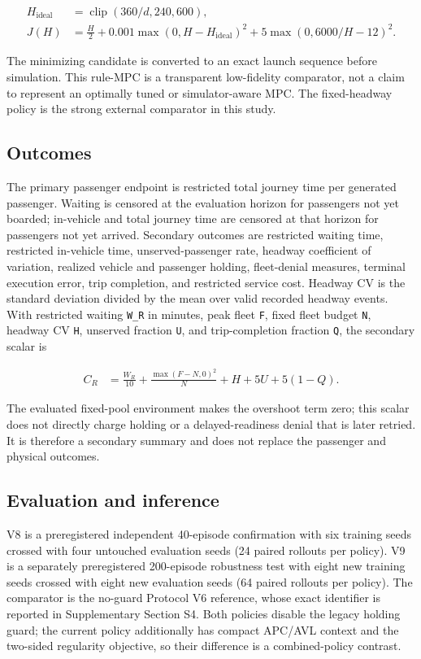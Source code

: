 \documentclass[preprint,12pt,authoryear,nopreprintline]{elsarticle}
\begin{document}
\[\begin{aligned}
H_{\mathrm{ideal}} &= \operatorname{clip}(360/d,240,600), \\
J(H) &= \frac{H}{2}
 + 0.001\max(0,H-H_{\mathrm{ideal}})^2
 + 5\max(0,6000/H-12)^2.
\end{aligned}\]

The minimizing candidate is converted to an exact launch sequence before
simulation. This rule-MPC is a transparent low-fidelity comparator, not
a claim to represent an optimally tuned or simulator-aware MPC. The
fixed-headway policy is the strong external comparator in this study.

\subsection{Outcomes}\label{outcomes}

The primary passenger endpoint is restricted total journey time per
generated passenger. Waiting is censored at the evaluation horizon for
passengers not yet boarded; in-vehicle and total journey time are
censored at that horizon for passengers not yet arrived. Secondary
outcomes are restricted waiting time, restricted in-vehicle time,
unserved-passenger rate, headway coefficient of variation, realized
vehicle and passenger holding, fleet-denial measures, terminal execution
error, trip completion, and restricted service cost. Headway CV is the
standard deviation divided by the mean over valid recorded headway
events. With restricted waiting \texttt{W\_R} in minutes, peak fleet
\texttt{F}, fixed fleet budget \texttt{N}, headway CV \texttt{H},
unserved fraction \texttt{U}, and trip-completion fraction \texttt{Q},
the secondary scalar is

\[\begin{aligned}
C_R &= \frac{W_R}{10}
 + \frac{\max(F-N,0)^2}{N}
 + H
 + 5U
 + 5(1-Q).
\end{aligned}\]

The evaluated fixed-pool environment makes the overshoot term zero; this
scalar does not directly charge holding or a delayed-readiness denial
that is later retried. It is therefore a secondary summary and does not
replace the passenger and physical outcomes.

\subsection{Evaluation and inference}\label{evaluation-and-inference}

V8 is a preregistered independent 40-episode confirmation with six
training seeds crossed with four untouched evaluation seeds (24 paired
rollouts per policy). V9 is a separately preregistered 200-episode
robustness test with eight new training seeds crossed with eight new
evaluation seeds (64 paired rollouts per policy). The comparator is the
no-guard Protocol V6 reference, whose exact identifier is reported in
Supplementary Section S4. Both policies disable the legacy holding
guard; the current policy additionally has compact APC/AVL context and
the two-sided regularity objective, so their difference is a
combined-policy contrast.
\end{document}
